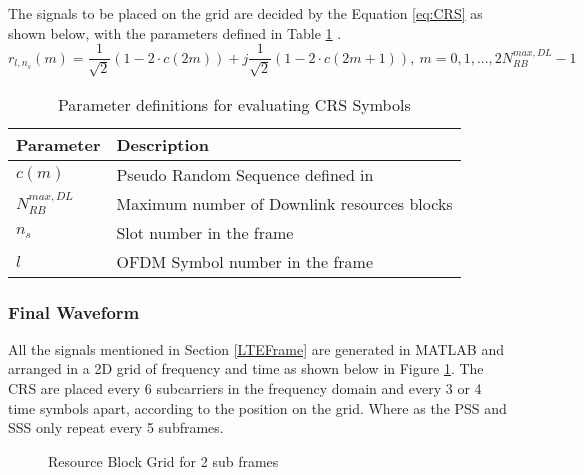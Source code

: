         The signals to be placed on the grid are decided by the Equation \ref{eq:CRS} as shown below, with the parameters defined in Table \ref{tab:CRSParam} \cite{3gpp36211}.
        \begin{equation} \label{eq:CRS}
            r_{l,n_s}(m) = \frac{1}{\sqrt{2}}(1-2{\cdot}c(2m)) + j\frac{1}{\sqrt{2}}(1-2{\cdot}c(2m+1)),\ m=0,1,...,2N_{RB}^{max,DL}-1
        \end{equation}

        \begin{table}[H]
            \begin{center}
                \begin{tabular}{|l|l|}
                    \hline
                    Parameter& Description\\ \hline
                    $c(m)$& Pseudo Random Sequence defined in \cite{3gpp36211}\\ \hline
                    $N_{RB}^{max,DL}$& Maximum number of Downlink resources blocks\\ \hline
                    $n_s$& Slot number in the frame\\ \hline
                    $l$& OFDM Symbol number in the frame\\
                    \hline
                \end{tabular}
                \caption{Parameter definitions for evaluating CRS Symbols}
                \label{tab:CRSParam}
            \end{center}
        \end{table}

\subsubsection{Final Waveform}
All the signals mentioned in Section \ref{LTEFrame} are generated in MATLAB and arranged in a 2D grid of frequency and time as shown below in Figure \ref{fig:RBSignals}. The CRS are placed every 6 subcarriers in the frequency domain and every 3 or 4 time symbols apart, according to the position on the grid. Where as the PSS and SSS only repeat every 5 subframes.

\begin{figure}[H]
    \begin{center}
        \caption{Resource Block Grid for 2 sub frames}
        \label{fig:RBSignals}
    \end{center}
\end{figure}

